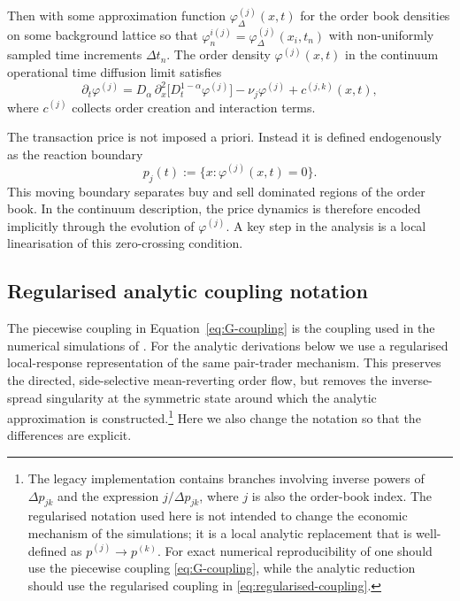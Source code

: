 \documentclass[5p,final]{elsarticle}
\begin{document}
Then with some approximation function $\varphi^{(j)}_{\Delta}(x,t)$ for the order book densities on some background lattice \cite{DianaGebbie2025} so that $\varphi^{i(j)}_n = \varphi^{(j)}_{\Delta}(x_i,t_n)$ with non-uniformly sampled time increments $\Delta t_n$. The order density $\varphi^{(j)}(x,t)$ in the continuum operational time diffusion limit satisfies 
\begin{equation}
\partial_t \varphi^{(j)}
= D_\alpha \, \partial_x^2 \bigl[ D_t^{1-\alpha} \varphi^{(j)} \bigr]
- \nu_j \varphi^{(j)} + c^{(j,k)}(x,t),
\end{equation}
where $c^{(j)}$ collects order creation and interaction terms.

The transaction price is not imposed a priori.
Instead it is defined endogenously as the reaction boundary
\begin{equation}
 p_j(t) := \{ x : \varphi^{(j)}(x,t)=0 \}.
\end{equation}
This moving boundary separates buy and sell dominated regions of the order book.
In the continuum description, the price dynamics is therefore encoded implicitly through the evolution of
$\varphi^{(j)}$. A key step in the analysis is a local linearisation of this zero-crossing condition.

\subsection{Regularised analytic coupling notation}
\label{ssec:regularised-analytic-coupling}

The piecewise coupling in Equation~\ref{eq:G-coupling} is the coupling used in the numerical simulations of \citet{BauerDianaGebbie2024}. For the analytic derivations below we use a regularised local-response representation of the same pair-trader mechanism. This preserves the directed, side-selective mean-reverting order flow, but removes the inverse-spread singularity at the symmetric state around which the analytic approximation is constructed.\footnote{The legacy implementation contains branches involving inverse powers of $\Delta p_{jk}$ and the expression $j/\Delta p_{jk}$, where $j$ is also the order-book index. The regularised notation used here is not intended to change the economic mechanism of the simulations; it is a local analytic replacement that is well-defined as $p^{(j)}\to p^{(k)}$. For exact numerical reproducibility of \citet{BauerDianaGebbie2024} one should use the piecewise coupling \cref{eq:G-coupling}, while the analytic reduction should use the regularised coupling in \cref{eq:regularised-coupling}.} Here we also change the notation so that the differences are explicit.
\end{document}
